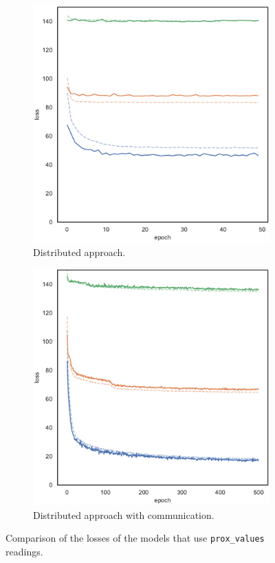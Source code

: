 \begin{figure}[!htb]
	\begin{center}
		\begin{subfigure}[h]{0.49\textwidth}
			\centering
			\includegraphics[width=.65\textwidth]{contents/images/task1-comm/loss-distributed-prox_values@copy}
			\caption{Distributed approach.}
		\end{subfigure}
		\hfill
		\begin{subfigure}[h]{0.49\textwidth}
			\centering
			\includegraphics[width=.7\textwidth]{contents/images/task1-comm/loss-communication-prox_values@copy}
			\caption{Distributed approach with communication.}
		\end{subfigure}	
	\end{center}
	\vspace{-0.5cm}
	\caption{Comparison of the losses of the models that use \texttt{prox\_values} 
		readings.}
	\label{fig:commlossprox_values}
\end{figure}

